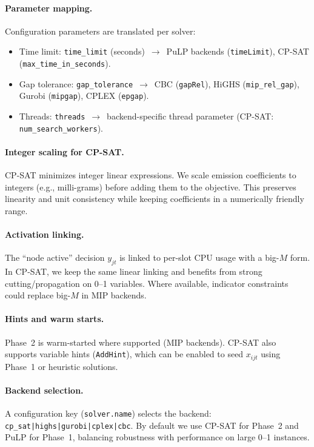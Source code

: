 \documentclass{article}
\begin{document}
\paragraph{Parameter mapping.} Configuration parameters are translated per solver:
\begin{itemize}
  \item Time limit: \texttt{time\_limit} (seconds) \,$\to$\, PuLP backends (\texttt{timeLimit}), CP-SAT (\texttt{max\_time\_in\_seconds}).
  \item Gap tolerance: \texttt{gap\_tolerance} \,$\to$\, CBC (\texttt{gapRel}), HiGHS (\texttt{mip\_rel\_gap}), Gurobi (\texttt{mipgap}), CPLEX (\texttt{epgap}).
  \item Threads: \texttt{threads} \,$\to$\, backend-specific thread parameter (CP-SAT: \texttt{num\_search\_workers}).
\end{itemize}

\paragraph{Integer scaling for CP-SAT.} CP-SAT minimizes integer linear expressions. We scale emission coefficients to integers (e.g., milli-grams) before adding them to the objective. This preserves linearity and unit consistency while keeping coefficients in a numerically friendly range.

\paragraph{Activation linking.} The ``node active'' decision $y_{jt}$ is linked to per-slot CPU usage with a big-$M$ form. In CP-SAT, we keep the same linear linking and benefits from strong cutting/propagation on 0--1 variables. Where available, indicator constraints could replace big-$M$ in MIP backends.

\paragraph{Hints and warm starts.} Phase~2 is warm-started where supported (MIP backends). CP-SAT also supports variable hints (\texttt{AddHint}), which can be enabled to seed $x_{ijt}$ using Phase~1 or heuristic solutions.

\paragraph{Backend selection.} A configuration key (\texttt{solver.name}) selects the backend: \texttt{cp\_sat|highs|gurobi|cplex|cbc}. By default we use CP-SAT for Phase~2 and PuLP for Phase~1, balancing robustness with performance on large 0--1 instances.
\end{document}
